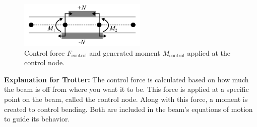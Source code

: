 \documentclass{article}
\begin{document}
	\begin{figure}[H]
		\centering
		\includegraphics[width=2.4in]{Figures/ControlForces_Figure.png}
		\caption{Control force \( F_{\text{control}} \) and generated moment \( M_{\text{control}} \) applied at the control node.}
		\label{fig:control_forces}
	\end{figure}
	
	\textbf{Explanation for Trotter:} The control force is calculated based on how much the beam is off from where you want it to be. This force is applied at a specific point on the beam, called the control node. Along with this force, a moment is created to control bending. Both are included in the beam’s equations of motion to guide its behavior.
	
\end{document}
